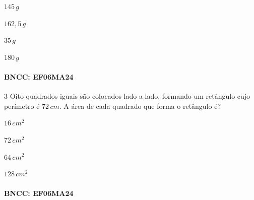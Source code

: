 {\begin{escolha}
\item $145\,g$
\item $162,5\,g$
\item $35\,g$
\item $180\,g$
\end{escolha}

\paragraph{BNCC: EF06MA24 }


\num{3}  Oito quadrados iguais são colocados lado a lado, formando um
retângulo cujo perímetro é $72\,cm$. A área de cada quadrado que forma o
retângulo é?

\begin{escolha}
\item $16\,cm^2$
\item $72\,cm^2$
\item $64\,cm^2$
\item $128\,cm^2$
\end{escolha}

\paragraph{BNCC: EF06MA24 }

}
